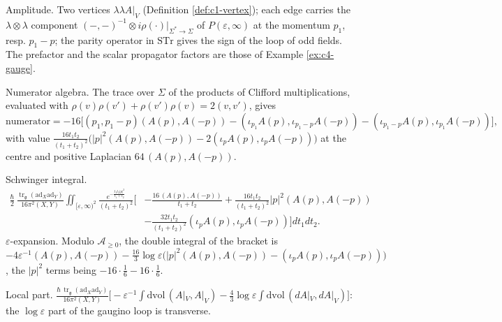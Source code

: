 \begin{example}
\label{ex:c4-gaugino}
Amplitude. Two vertices $\lambda\lambda A|_V$ (Definition \ref{def:c1-vertex}); each edge carries the $\lambda\otimes\lambda$ component $(-,-)^{-1}\otimes i\rho(\cdot)|_{\Sigma^*\to\Sigma}$ of $P(\varepsilon,\infty)$ at the momentum $p_1$, resp. $p_1-p$; the parity operator in $\mathrm{STr}$ gives the sign of the loop of odd fields. The prefactor and the scalar propagator factors are those of Example \ref{ex:c4-gauge}.

Numerator algebra. The trace over $\Sigma$ of the products of Clifford multiplications, evaluated with $\rho(v)\rho(v')+\rho(v')\rho(v)=2(v,v')$, gives
\[
\text{numerator}=-16\big[(p_1,p_1-p)(A(p),A(-p))-(\iota_{p_1}A(p),\iota_{p_1-p}A(-p))-(\iota_{p_1-p}A(p),\iota_{p_1}A(-p))\big],
\]
with value $\frac{16t_1t_2}{(t_1+t_2)^2}\big(|p|^2(A(p),A(-p))-2(\iota_pA(p),\iota_pA(-p))\big)$ at the centre and positive Laplacian $64\,(A(p),A(-p))$.

Schwinger integral.
\[
\begin{aligned}
\frac\hbar2\,\frac{\operatorname{tr}_{\mathfrak g}(\mathrm{ad}_X\mathrm{ad}_Y)}{16\pi^2(X,Y)}\iint_{[\varepsilon,\infty)^2}\frac{e^{-\frac{t_1t_2|p|^2}{t_1+t_2}}}{(t_1+t_2)^2}\Big[&-\frac{16\,(A(p),A(-p))}{t_1+t_2}+\frac{16t_1t_2}{(t_1+t_2)^2}|p|^2(A(p),A(-p))\\
&-\frac{32t_1t_2}{(t_1+t_2)^2}(\iota_pA(p),\iota_pA(-p))\Big]dt_1dt_2 .
\end{aligned}
\]
$\varepsilon$-expansion. Modulo $\mathscr A_{\ge0}$, the double integral of the bracket is $-4\varepsilon^{-1}(A(p),A(-p))-\tfrac{16}{3}\log\varepsilon\big(|p|^2(A(p),A(-p))-(\iota_pA(p),\iota_pA(-p))\big)$, the $|p|^2$ terms being $-16\cdot\tfrac16-16\cdot\tfrac16$.

Local part. $\frac{\hbar\,\operatorname{tr}_{\mathfrak g}(\mathrm{ad}_X\mathrm{ad}_Y)}{16\pi^2(X,Y)}\big[-\varepsilon^{-1}\int\mathrm{dvol}\,(A|_V,A|_V)-\tfrac43\log\varepsilon\int\mathrm{dvol}\,(dA|_V,dA|_V)\big]$: the $\log\varepsilon$ part of the gaugino loop is transverse.
\end{example}

